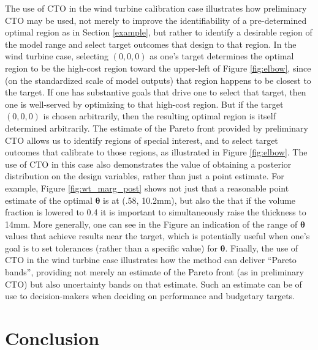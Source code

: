 \documentclass[12pt]{article}
\begin{document}
The use of CTO in the wind turbine calibration case illustrates how preliminary CTO may be used, not merely to improve the identifiability of a pre-determined optimal region as in Section \ref{example}, but rather to identify a desirable region of the model range and select target outcomes that design to that region.
%
In the wind turbine case, selecting $(0,0,0)$ as one's target determines the optimal region to be the high-cost region toward the upper-left of Figure \ref{fig:elbow}, since (on the standardized scale of model outputs) that region happens to be closest to the target.
%
If one has substantive goals that drive one to select that target, then one is well-served by optimizing to that high-cost region.
%
But if the target $(0,0,0)$ is chosen arbitrarily, then the resulting optimal region is itself determined arbitrarily.
%
The estimate of the Pareto front provided by preliminary CTO allows us to identify regions of special interest, and to select target outcomes that calibrate to those regions, as illustrated in Figure \ref{fig:elbow}.
%
The use of CTO in this case also demonstrates the value of obtaining a posterior distribution on the design variables, rather than just a point estimate.
%
For example, Figure \ref{fig:wt_marg_post} shows not just that a reasonable point estimate of the optimal $\boldsymbol\theta$ is at (.58, 10.2mm), but also the that if the volume fraction is lowered to 0.4 it is important to simultaneously raise the thickness to 14mm.
%
More generally, one can see in the Figure an indication of the range of $\boldsymbol\theta$ values that achieve results near the target, which is potentially useful when one's goal is to set tolerances (rather than a specific value) for $\boldsymbol\theta$.
%
Finally, the use of CTO in the wind turbine case illustrates how the method can deliver ``Pareto bands'', providing not merely an estimate of the Pareto front (as in preliminary CTO) but also uncertainty bands on that estimate.
%
Such an estimate can be of use to decision-makers when deciding on performance and budgetary targets.




\section{Conclusion} \label{conclusion}
\end{document}

